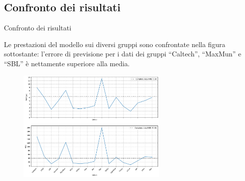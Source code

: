 \documentclass{beamer}
\begin{document}
\subsection{Confronto dei risultati}
\begin{frame}{Confronto dei risultati}

	Le prestazioni del modello sui diversi gruppi sono confrontate nella figura sottostante: 
l'errore di previsione per i dati dei gruppi ``Caltech'', ``MaxMun'' e ``SBL'' è nettamente superiore alla media.

	\begin{figure}
		\includegraphics[width=0.65\textwidth]{result_1.png}
		\label{plotRMSComparison2}
	\end{figure}

\end{frame}


\end{document}
